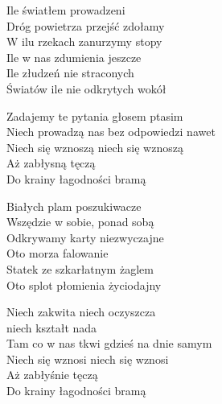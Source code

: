 
\begin{text}
    Ile światłem prowadzeni\\
    Dróg powietrza przejść zdołamy\\
    W ilu rzekach zanurzymy stopy\\
    Ile w nas zdumienia jeszcze\\
    Ile złudzeń nie straconych\\
    Światów ile nie odkrytych wokół

    Zadajemy te pytania głosem ptasim\\
    Niech prowadzą nas bez odpowiedzi nawet\\
    Niech się wznoszą niech się wznoszą\\
    Aż zabłysną tęczą\\
    Do krainy łagodności bramą

    Białych plam poszukiwacze\\
    Wszędzie w sobie, ponad sobą\\
    Odkrywamy karty niezwyczajne\\
    Oto morza falowanie\\
    Statek ze szkarłatnym żaglem\\
    Oto splot płomienia życiodajny

    Niech zakwita niech oczyszcza\\
    niech kształt nada\\
    Tam co w nas tkwi gdzieś na dnie samym\\
    Niech się wznosi niech się wznosi\\
    Aż zabłyśnie tęczą\\
    Do krainy łagodności bramą
\end{text}
\begin{chord}

\end{chord}